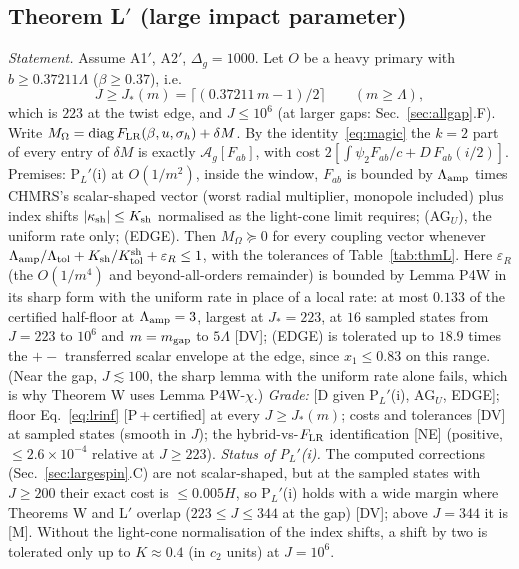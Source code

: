 \documentclass[aps,prl,onecolumn,superscriptaddress,nofootinbib]{revtex4-2}
\begin{document}
\subsection{Theorem L$'$ (large impact parameter)}
\emph{Statement.} Assume A1$'$, A2$'$, $\Delta_g=1000$. Let $O$ be a heavy primary with $b\ge0.37211\Lambda$ ($\beta\ge0.37$), i.e.\
\begin{equation}
J\ge J_*(m)=\big\lceil(0.37211\,m-1)/2\big\rceil\qquad(m\ge\Lambda),
\label{eq:jstarL}
\end{equation}
which is $223$ at the twist edge, and $J\le10^6$ (at larger gaps: Sec.~\ref{sec:allgap}.F). Write $M_\Omega={\rm diag}\,F_{\rm LR}(\beta,u,\sigma_h)+\delta M$. By the
identity~\eqref{eq:magic} the $k=2$ part of every entry of $\delta M$ is exactly $\mathcal A_g[F_{ab}]$, with cost
$2[\int\psi_2F_{ab}/c+D\,F_{ab}(i/2)]$. Premises: P$_L'$(i) at $O(1/m^2)$, inside the window, $F_{ab}$ is bounded by
$\Lambda_{\rm amp}$ times CHMRS's scalar-shaped vector (worst radial multiplier, monopole included) plus index shifts
$|\kappa_{\rm sh}|\le K_{\rm sh}$ normalised as the light-cone limit requires; (AG$_U$), the uniform rate only; (EDGE). Then $M_\Omega\succeq0$ for every
coupling vector whenever $\Lambda_{\rm amp}/\Lambda_{\rm tol}+K_{\rm sh}/K^{\rm sh}_{\rm tol}+\varepsilon_R\le1$, with the tolerances of
Table~\ref{tab:thmL}. Here $\varepsilon_R$ (the $O(1/m^4)$ and beyond-all-orders remainder) is bounded by
Lemma P4W in its sharp form with the uniform rate in place of a local rate: at most $0.133$ of the certified half-floor at
$\Lambda_{\rm amp}=3$, largest at $J_*=223$, at $16$ sampled states from $J=223$ to $10^6$ and
$m=m_{\rm gap}$ to $5\Lambda$ [DV]; (EDGE) is tolerated up to $18.9$ times the $+-$ transferred scalar envelope at the edge,
since $x_1\le0.83$ on this range. (Near the gap, $J\lesssim100$, the sharp lemma with the uniform rate alone fails, which is why
Theorem W uses Lemma P4W-$\chi$.) \emph{Grade:} [D given P$_L'$(i), AG$_U$, EDGE]; floor
Eq.~\eqref{eq:lrinf} [P\,+\,certified] at every $J\ge J_*(m)$; costs and tolerances [DV] at sampled states (smooth in $J$);
the hybrid-vs-$F_{\rm LR}$ identification [NE] (positive, $\le2.6\times10^{-4}$ relative at $J\ge223$). \emph{Status of P$_L'$(i).}
The computed corrections (Sec.~\ref{sec:largespin}.C) are not scalar-shaped, but at the sampled states with $J\ge200$ their exact
cost is $\le0.005H$, so P$_L'$(i) holds with a wide margin where Theorems W and L$'$ overlap ($223\le J\le344$ at the gap) [DV];
above $J=344$ it is [M]. Without the light-cone normalisation of the index shifts, a shift by two is tolerated only up to
$K\approx0.4$ (in $c_2$ units) at $J=10^6$.
\end{document}
